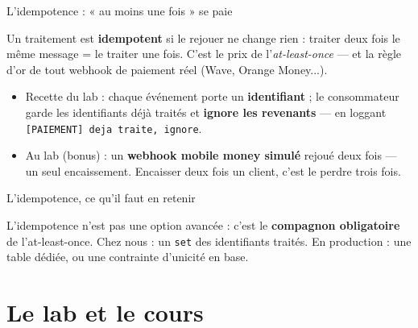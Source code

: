 \documentclass[aspectratio=169,11pt]{beamer}
\begin{document}
\begin{frame}{L'idempotence : « au moins une fois » se paie}
\begin{ucaddef}[Définition]
{\small Un traitement est \textbf{idempotent} si le rejouer ne change rien : traiter deux fois le même message = le traiter une fois. C'est le prix de l'\emph{at-least-once} — et la règle d'or de tout webhook de paiement réel (Wave, Orange Money...).}
\end{ucaddef}
\begin{itemize}\small
  \item Recette du lab : chaque événement porte un \textbf{identifiant} ; le consommateur garde les identifiants déjà traités et \textbf{ignore les revenants} — en loggant \texttt{[PAIEMENT] deja traite, ignore}.
  \item Au lab (bonus) : un \textbf{webhook mobile money simulé} rejoué deux fois — un seul encaissement. Encaisser deux fois un client, c'est le perdre trois fois.
\end{itemize}
\end{frame}

\begin{frame}{L'idempotence, ce qu'il faut en retenir}
\begin{ucadret}[À retenir]
{\small L'idempotence n'est pas une option avancée : c'est le \textbf{compagnon obligatoire} de l'at-least-once. Chez nous : un \texttt{set} des identifiants traités. En production : une table dédiée, ou une contrainte d'unicité en base.}
\end{ucadret}
\end{frame}

\section{Le lab et le cours}
\end{document}
